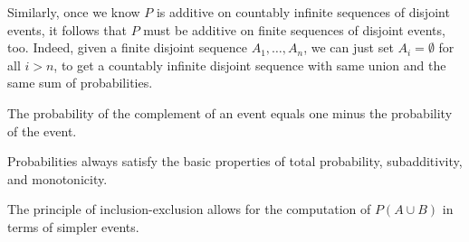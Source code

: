 Similarly, once we know $P$ is additive on countably infinite sequences of disjoint events, it follows that $P$ must
be additive on finite sequences of disjoint events, too. Indeed, given a finite disjoint sequence $A_1, \ldots, A_n$,
we can just set $A_i=\emptyset$ for all $i > n$, to get a countably infinite disjoint sequence with same union and
the same sum of probabilities.

\begin{summary}
    \item The probability of the complement of an event equals one minus the probability of the event.
    \item Probabilities always satisfy the basic properties of total probability, subadditivity, and monotonicity.
    \item The principle of inclusion-exclusion allows for the computation of $P(A \cup B)$ in terms of simpler events.
\end{summary}

